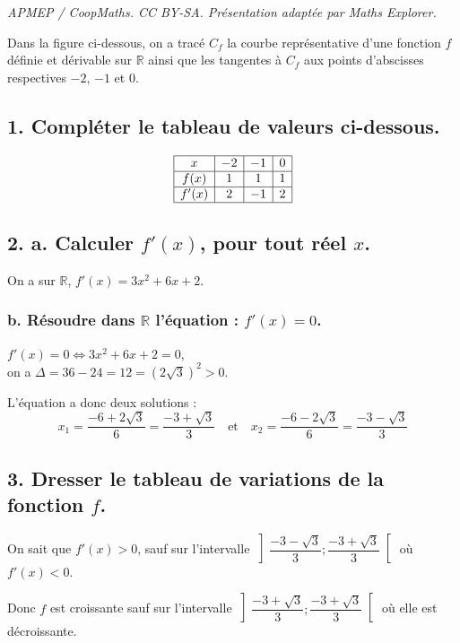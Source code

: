 \documentclass[10pt]{article}
\begin{document}
\noindent\textit{APMEP / CoopMaths. CC BY-SA. Présentation adaptée par Maths Explorer.}\par\medskip
Dans la figure ci-dessous, on a tracé $C_f$ la courbe représentative d'une fonction $f$ définie et dérivable sur $\mathbb{R}$ ainsi que les tangentes à $C_f$ aux points d'abscisses respectives $-2$, $-1$ et 0.
	
\subsection*{1. Compléter le tableau de valeurs ci-dessous. }
	
	\[
	\begin{array}{|c|c|c|c|}
		\hline	x & -2 & -1 & 0 \\
		\hline
		f(x) & 1 & 1 & 1 \\
		\hline
		f'(x) & 2 & -1 & 2 \\
			\hline
	\end{array}
	\]
	

	\subsection*{2. a. Calculer $f'(x)$, pour tout réel $x$.}
	
	On a sur $\mathbb{R}$, $f'(x) = 3x^2 + 6x + 2$.
	
	\subsubsection*{b. Résoudre dans $\mathbb{R}$ l'équation : $f'(x) = 0$.}
	
	$f'(x) = 0 \iff 3x^2 + 6x + 2 = 0$, \\
	on a $\Delta = 36 - 24 = 12 = (2\sqrt{3})^2 > 0$.
	
	L'équation a donc deux solutions :
	\[
	x_1 = \dfrac{-6 + 2\sqrt{3}}{6} = \dfrac{-3 + \sqrt{3}}{3} \quad \text{et} \quad x_2 = \dfrac{-6 - 2\sqrt{3}}{6} = \dfrac{-3 - \sqrt{3}}{3}
	\]
	
	\subsection*{3. Dresser le tableau de variations de la fonction $f$.}
	
	On sait que $f'(x) > 0$, sauf sur l'intervalle $\left] \dfrac{-3 - \sqrt{3}}{3} ; \dfrac{-3 + \sqrt{3}}{3} \right[$ où $f'(x) < 0$.
	
	Donc $f$ est croissante sauf sur l'intervalle $\left] \dfrac{-3 + \sqrt{3}}{3} ; \dfrac{-3 + \sqrt{3}}{3} \right[$ où elle est décroissante.
	
\end{document}
